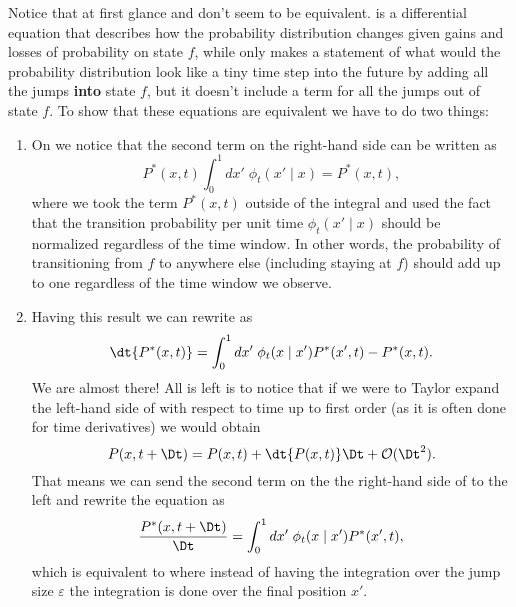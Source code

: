 Notice that at first glance  and
 don't seem to be equivalent.
 is a differential equation that describes how the
probability distribution changes given gains and losses of probability on state
$f$, while  only makes a statement of what would the
probability distribution look like a tiny time step into the future by adding
all the jumps \textbf{into} state $f$, but it doesn't include a term for all
the jumps out of state $f$. To show that these equations are equivalent we have
to do two things:
\begin{enumerate}
  \item On  we notice that the second term on the
  right-hand side can be written as
  \begin{equation}
    P^*(x, t)\int_0^1 dx' \; \phi_t(x' \mid x) = P^*(x, t),
    \label{eq_integral_transition}
  \end{equation}
  where we took the term $P^*(x, t)$ outside of the integral and used the fact
  that the transition probability per unit time $\phi_t(x' \mid x)$ should be
  normalized regardless of the time window. In other words, the probability of
  transitioning from $f$ to anywhere else (including staying at $f$) should add
  up to one regardless of the time window we observe.
  \item Having this result we can rewrite  as
  \begin{equation}
    \dt{P^*(x, t)} = \int_0^1 dx' \;
    \phi_t(x \mid x') P^*(x', t) - P^*(x, t).
    \label{eq_master_eq_rearange}
  \end{equation}
  We are almost there! All is left is to notice that if we were to Taylor
  expand the left-hand side of  with respect to time
  up to first order (as it is often done for time derivatives) we would obtain
  \begin{equation}
    P(x, t + \Dt) = P(x, t) + \dt{P(x, t)}\Dt + \mathcal{O}(\Dt^2).
  \end{equation}
  That means we can send the second term on the the right-hand side of
   to the left and rewrite the equation as
  \begin{equation}
    {P^*(x, t + \Dt) \over \Dt} = \int_0^1 dx' \;
    \phi_t(x \mid x') P^*(x', t),
  \end{equation}
  which is equivalent to  where instead of having
  the integration over the jump size $\varepsilon$ the integration is done over
  the final position $x'$.
\end{enumerate}
